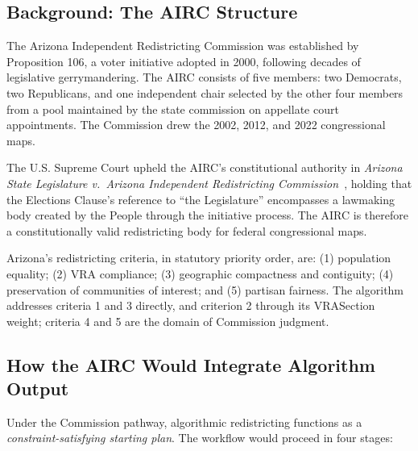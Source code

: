 \label{sec:arizona}

\subsection{Background: The AIRC Structure}

The Arizona Independent Redistricting Commission was established by Proposition
106, a voter initiative adopted in 2000, following decades of legislative
gerrymandering.  The AIRC consists of five members: two Democrats, two
Republicans, and one independent chair selected by the other four members from
a pool maintained by the state commission on appellate court appointments.  The
Commission drew the 2002, 2012, and 2022 congressional maps.

The U.S. Supreme Court upheld the AIRC's constitutional authority in
\textit{Arizona State Legislature v.\ Arizona Independent Redistricting
Commission}~\citep{airc2015}, holding that the Elections Clause's reference to
``the Legislature'' encompasses a lawmaking body created by the People through
the initiative process.  The AIRC is therefore a constitutionally valid
redistricting body for federal congressional maps.

Arizona's redistricting criteria, in statutory priority order, are:
(1) population equality; (2) VRA compliance; (3) geographic compactness
and contiguity; (4) preservation of communities of interest; and (5)
partisan fairness.  The algorithm addresses criteria 1 and 3 directly, and
criterion 2 through its VRASection weight; criteria 4 and 5 are the domain
of Commission judgment.

\subsection{How the AIRC Would Integrate Algorithm Output}

Under the Commission pathway, algorithmic redistricting functions as a
\emph{constraint-satisfying starting plan}.  The workflow would proceed in
four stages:

